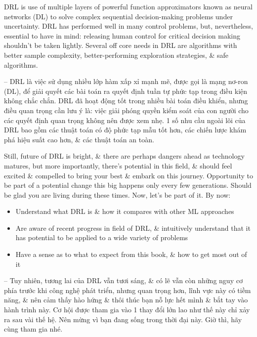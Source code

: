 \documentclass{article}
\begin{document}
\begin{itemize}
\begin{itemize}
        DRL is use of multiple layers of powerful function approximators known as neural networks (DL) to solve complex sequential decision-making problems under uncertainty. DRL has performed well in many control problems, but, nevertheless, essential to have in mind: releasing human control for critical decision making shouldn't be taken lightly. Several off core needs in DRL are algorithms with better sample complexity, better-performing exploration strategies, \& safe algorithms.

        -- DRL là việc sử dụng nhiều lớp hàm xấp xỉ mạnh mẽ, được gọi là mạng nơ-ron (DL), để giải quyết các bài toán ra quyết định tuần tự phức tạp trong điều kiện không chắc chắn. DRL đã hoạt động tốt trong nhiều bài toán điều khiển, nhưng điều quan trọng cần lưu ý là: việc giải phóng quyền kiểm soát của con người cho các quyết định quan trọng không nên được xem nhẹ. 1 số nhu cầu ngoài lõi của DRL bao gồm các thuật toán có độ phức tạp mẫu tốt hơn, các chiến lược khám phá hiệu suất cao hơn, \& các thuật toán an toàn.

        Still, future of DRL is bright, \& there are perhaps dangers ahead as technology matures, but more importantly, there's potential in this field, \& should feel excited \& compelled to bring your best \& embark on this journey. Opportunity to be part of a potential change this big happens only every few generations. Should be glad you are living during these times. Now, let's be part of it. By now:
        \begin{itemize}
            \item Understand what DRL is \& how it compares with other ML approaches
            \item Are aware of recent progress in field of DRL, \& intuitively understand that it has potential to be applied to a wide variety of problems
            \item Have a sense as to what to expect from this book, \& how to get most out of it
        \end{itemize}
        -- Tuy nhiên, tương lai của DRL vẫn tươi sáng, \& có lẽ vẫn còn những nguy cơ phía trước khi công nghệ phát triển, nhưng quan trọng hơn, lĩnh vực này có tiềm năng, \& nên cảm thấy hào hứng \& thôi thúc bạn nỗ lực hết mình \& bắt tay vào hành trình này. Cơ hội được tham gia vào 1 thay đổi lớn lao như thế này chỉ xảy ra sau vài thế hệ. Nên mừng vì bạn đang sống trong thời đại này. Giờ thì, hãy cùng tham gia nhé.


\end{itemize}
\end{itemize}
\end{document}
